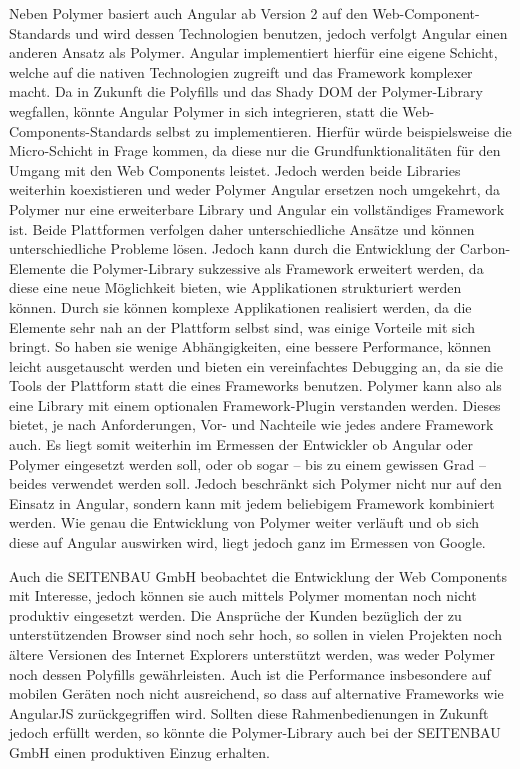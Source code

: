 Neben Polymer basiert auch Angular ab Version 2 auf den Web-Component-Stan\-dards und wird dessen Technologien benutzen, jedoch verfolgt Angular einen anderen Ansatz als Polymer. Angular implementiert hierfür eine eigene Schicht, welche auf die nativen Technologien zugreift und das Framework komplexer macht. Da in Zukunft die Polyfills und das Shady \ac{DOM} der Polymer-Library wegfallen, könnte Angular Polymer in sich integrieren, statt die Web-Components-Standards selbst zu implementieren. Hierfür würde beispielsweise die Micro-Schicht in Frage kommen, da diese nur die Grundfunktionalitäten für den Umgang mit den Web Components leistet. Jedoch werden beide Libraries weiterhin koexistieren und weder Polymer Angular ersetzen noch umgekehrt, da Polymer nur eine erweiterbare Library und Angular ein vollständiges Framework ist. Beide Plattformen verfolgen daher unterschiedliche Ansätze und können unterschiedliche Probleme lösen. Jedoch kann durch die Entwicklung der Carbon-Elemente die Polymer-Library sukzessive als Framework erweitert werden, da diese eine neue Möglichkeit bieten, wie Applikationen strukturiert werden können. Durch sie können komplexe Applikationen realisiert werden, da die Elemente sehr nah an der Plattform selbst sind, was einige Vorteile mit sich bringt. So haben sie wenige Abhängigkeiten, eine bessere Performance, können leicht ausgetauscht werden und bieten ein vereinfachtes Debugging an, da sie die Tools der Plattform statt die eines Frameworks benutzen. Polymer kann also als eine Library mit einem optionalen Framework-Plugin verstanden werden. Dieses bietet, je nach Anforderungen, Vor- und Nachteile wie jedes andere Framework auch. Es liegt somit weiterhin im Ermessen der Entwickler ob Angular oder Polymer eingesetzt werden soll, oder ob sogar -- bis zu einem gewissen Grad -- beides verwendet werden soll. Jedoch beschränkt sich Polymer nicht nur auf den Einsatz in Angular, sondern kann mit jedem beliebigem Framework kombiniert werden. Wie genau die Entwicklung von Polymer weiter verläuft und ob sich diese auf Angular auswirken wird, liegt jedoch ganz im Ermessen von Google.

Auch die SEITENBAU GmbH beobachtet die Entwicklung der Web Components mit Interesse, jedoch können sie auch mittels Polymer momentan noch nicht produktiv eingesetzt werden. Die Ansprüche der Kunden bezüglich der zu unterstützenden Browser sind noch sehr hoch, so sollen in vielen Projekten noch ältere Versionen des Internet Explorers unterstützt werden, was weder Polymer noch dessen Polyfills gewährleisten. Auch ist die Performance insbesondere auf mobilen Geräten noch nicht ausreichend, so dass auf alternative Frameworks wie AngularJS zurückgegriffen wird. Sollten diese Rahmenbedienungen in Zukunft jedoch erfüllt werden, so könnte die Polymer-Library auch bei der SEITENBAU GmbH einen produktiven Einzug erhalten.
